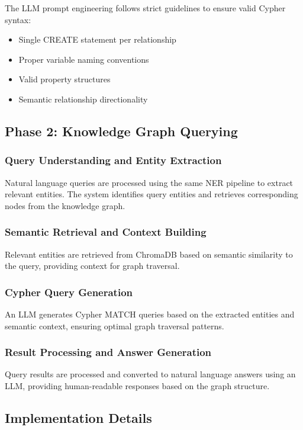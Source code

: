 \documentclass[conference]{IEEEtran}
\begin{document}
The LLM prompt engineering follows strict guidelines to ensure valid Cypher syntax:
\begin{itemize}
\item Single CREATE statement per relationship
\item Proper variable naming conventions
\item Valid property structures
\item Semantic relationship directionality
\end{itemize}

\subsection{Phase 2: Knowledge Graph Querying}

\subsubsection{Query Understanding and Entity Extraction}
Natural language queries are processed using the same NER pipeline to extract relevant entities. The system identifies query entities and retrieves corresponding nodes from the knowledge graph.

\subsubsection{Semantic Retrieval and Context Building}
Relevant entities are retrieved from ChromaDB based on semantic similarity to the query, providing context for graph traversal.

\subsubsection{Cypher Query Generation}
An LLM generates Cypher MATCH queries based on the extracted entities and semantic context, ensuring optimal graph traversal patterns.

\subsubsection{Result Processing and Answer Generation}
Query results are processed and converted to natural language answers using an LLM, providing human-readable responses based on the graph structure.

\subsection{Implementation Details}
\end{document}
